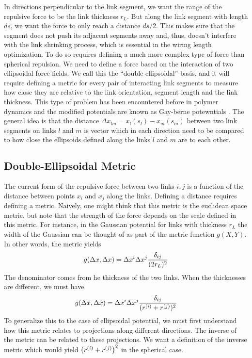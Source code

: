 \documentclass[nofootinbib,preprint,floatfix,titlepage,superscriptaddress]{revtex4} %
\begin{document}
In directions perpendicular to the link segment, we want the range of the repulsive force to be the link thickness $r_L$. But along the link segment with length $ds$, we want the force to only reach a distance $ds/2$. 
This makes sure that the segment does not push its adjacent segments away and, thus, doesn't interfere with the link shrinking process, which is essential in the wiring length optimization.
To do so requires defining a much more complex type of force than spherical repulsion. 
We need to define a force based on the interaction of two ellipsoidal force fields. We call this the ``double-ellipsoidal'' basis, and it will require defining a metric for every pair of interacting link segments to measure how close they are relative to the link orientation, segment length and the link thickness. 
This type of problem has been encountered before in polymer dynamics and the modified potentials are known as Gay-berne potewntials \citep{berne1972gaussian,gay1981modification,babadi2006coarse}. 
The general idea is that the distance $\Delta x_{lm} = x_l(s_l) - x_m(s_m)$ between two link segments on links $l$ and $m$ is vector which in each direction need to be compared to how close the ellipsoids defined along the links $l$ and $m$ are to each other. 

\subsection{Double-Ellipsoidal Metric }
The current form of the repulsive force between two links $i,j$ is a function of the distance between points $x_i$ and $x_j$ along the links. 
Defining a distance requires defining a metric. 
Naively, one might think that this metric is the euclidean space metric, but note that the strength of the force depends on the scale defined in this metric. 
For instance, in the Gaussian potential for links with thickness $r_L$ the width of the Gaussian can be thought of as part of the metric function $g(X,Y)$. 
In other words, the metric yields
\[g(\Delta x, \Delta x) = \Delta x^i \Delta x^j {\delta_{ij} \over (2 r_L)^2}  \]
The denominator comes from he thickness of the two links. When the thicknesses are different, we must have
\[g(\Delta x, \Delta x) = \Delta x^i \Delta x^j {\delta_{ij} \over ( r^{(i)} +r^{(j)})^2}  \]
To generalize this to the case of ellipsoidal potential, we must first understand how this metric relates to projections along different directions. 
The inverse of the metric can be related to these projections. 
We want a definition of the inverse metric which would yield $\left(r^{(i)} +r^{(j)}\right)^2$ in the spherical case. 
\end{document}
